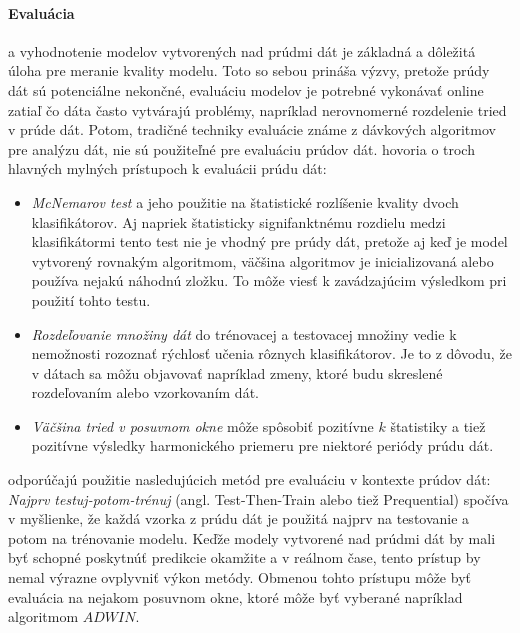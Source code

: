 \paragraph{Evaluácia} a vyhodnotenie modelov vytvorených nad prúdmi dát je základná a dôležitá úloha pre meranie kvality modelu. Toto so sebou prináša výzvy, pretože prúdy dát sú potenciálne nekončné, evaluáciu modelov je potrebné vykonávať online zatiaľ čo dáta často vytvárajú problémy, napríklad nerovnomerné rozdelenie tried v prúde dát. Potom, tradičné techniky evaluácie známe z dávkových algoritmov pre analýzu dát, nie sú použiteľné pre evaluáciu prúdov dát. \citet{bifet2015efficient} hovoria o troch hlavných mylných prístupoch k evaluácii prúdu dát:
\begin{itemize}
	\item \textit{McNemarov test} a jeho použitie na štatistické rozlíšenie kvality dvoch klasifikátorov. Aj napriek štatisticky signifanktnému rozdielu medzi klasifikátormi tento test nie je vhodný pre prúdy dát, pretože aj keď je model vytvorený rovnakým algoritmom, väčšina algoritmov je inicializovaná alebo používa nejakú náhodnú zložku. To môže viesť k zavádzajúcim výsledkom pri použití tohto testu.
	\item \textit{Rozdeľovanie množiny dát} do trénovacej a testovacej množiny vedie k nemožnosti rozoznať rýchlosť učenia rôznych klasifikátorov. Je to z dôvodu, že v dátach sa môžu objavovať napríklad zmeny, ktoré budu skreslené rozdeľovaním alebo vzorkovaním dát.
	\item \textit{Väčšina tried v posuvnom okne} môže spôsobiť pozitívne $k$ štatistiky a tiež pozitívne výsledky harmonického priemeru pre niektoré periódy prúdu dát.
\end{itemize}

\citet{bifet2015efficient} odporúčajú použitie nasledujúcich metód pre evaluáciu v kontexte prúdov dát: \textit{Najprv testuj-potom-trénuj} (angl. Test-Then-Train alebo tiež Prequential) spočíva v myšlienke, že každá vzorka z prúdu dát je použitá najprv na testovanie a potom na trénovanie modelu. Keďže modely vytvorené nad prúdmi dát by mali byť schopné poskytnúť predikcie okamžite a v reálnom čase, tento prístup by nemal výrazne ovplyvniť výkon metódy. Obmenou tohto prístupu môže byť evaluácia na nejakom posuvnom okne, ktoré môže byť vyberané napríklad algoritmom $ADWIN$.


